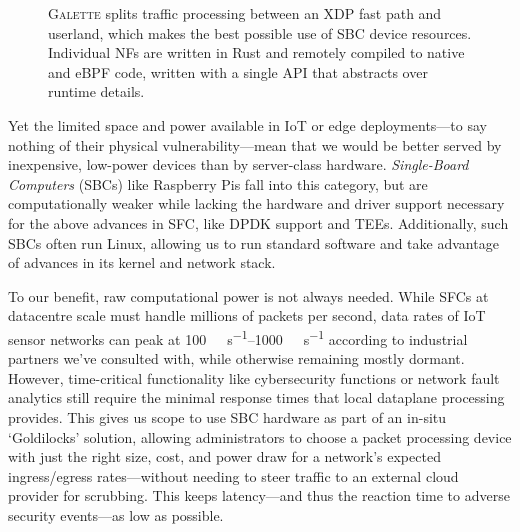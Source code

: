 \documentclass[comsoc, conference, times]{IEEEtran}
\newcommand{\ourtech}{\textsc{Galette}}
\newcommand{\af}{(\texttt{AF\_})XDP}
\begin{document}
\begin{figure}
	\centering
	\resizebox{0.9\linewidth}{!}{}
	\caption{\ourtech{} splits traffic processing between an XDP fast path and userland, which makes the best possible use of SBC device resources. Individual NFs are written in Rust and remotely compiled to native and eBPF code, written with a single API that abstracts over runtime details.\label{fig:arch}}
\end{figure}

Yet the limited space and power available in IoT or edge deployments---to say nothing of their physical vulnerability---mean that we would be better served by inexpensive, low-power devices than by server-class hardware.
\emph{Single-Board Computers} (SBCs) like Raspberry Pis fall into this category, but are computationally weaker while lacking the hardware and driver support necessary for the above advances in SFC, like DPDK support and TEEs.
Additionally, such SBCs often run Linux, allowing us to run standard software and take advantage of advances in its kernel and network stack.%

To our benefit, raw computational power is not always needed.
While SFCs at datacentre scale must handle millions of packets per second, data rates of IoT sensor networks can peak at \qtyrange{100}{1000}{\kilo\bit\per\second} according to industrial partners we've consulted with, while otherwise remaining mostly dormant.
However, time-critical functionality like cybersecurity functions or network fault analytics still require the minimal response times that local dataplane processing provides.
This gives us scope to use SBC hardware as part of an in-situ `Goldilocks' solution, allowing administrators to choose a packet processing device with just the right size, cost, and power draw for a network's expected ingress/egress rates---without needing to steer traffic to an external cloud provider for scrubbing.
This keeps latency---and thus the reaction time to adverse security events---as low as possible.

\end{document}

